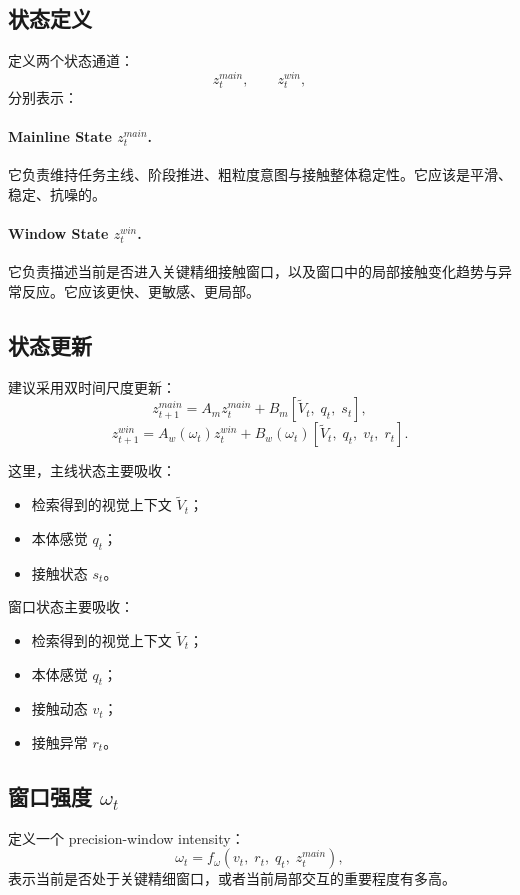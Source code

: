 \documentclass[11pt]{article}
\begin{document}
\subsection{状态定义}

定义两个状态通道：
\[
z_t^{main}, \qquad z_t^{win},
\]
分别表示：

\paragraph{Mainline State $z_t^{main}$.}
它负责维持任务主线、阶段推进、粗粒度意图与接触整体稳定性。它应该是平滑、稳定、抗噪的。

\paragraph{Window State $z_t^{win}$.}
它负责描述当前是否进入关键精细接触窗口，以及窗口中的局部接触变化趋势与异常反应。它应该更快、更敏感、更局部。

\subsection{状态更新}

建议采用双时间尺度更新：
\[
z_{t+1}^{main} = A_m z_t^{main} + B_m [\tilde V_t,\; q_t,\; s_t],
\]
\[
z_{t+1}^{win} = A_w(\omega_t) z_t^{win} + B_w(\omega_t) [\tilde V_t,\; q_t,\; v_t,\; r_t].
\]

这里，主线状态主要吸收：
\begin{itemize}[leftmargin=2em]
    \item 检索得到的视觉上下文 $\tilde V_t$；
    \item 本体感觉 $q_t$；
    \item 接触状态 $s_t$。
\end{itemize}

窗口状态主要吸收：
\begin{itemize}[leftmargin=2em]
    \item 检索得到的视觉上下文 $\tilde V_t$；
    \item 本体感觉 $q_t$；
    \item 接触动态 $v_t$；
    \item 接触异常 $r_t$。
\end{itemize}

\subsection{窗口强度 $\omega_t$}

定义一个 precision-window intensity：
\[
\omega_t = f_\omega(v_t,\; r_t,\; q_t,\; z_t^{main}),
\]
表示当前是否处于关键精细窗口，或者当前局部交互的重要程度有多高。
\end{document}
